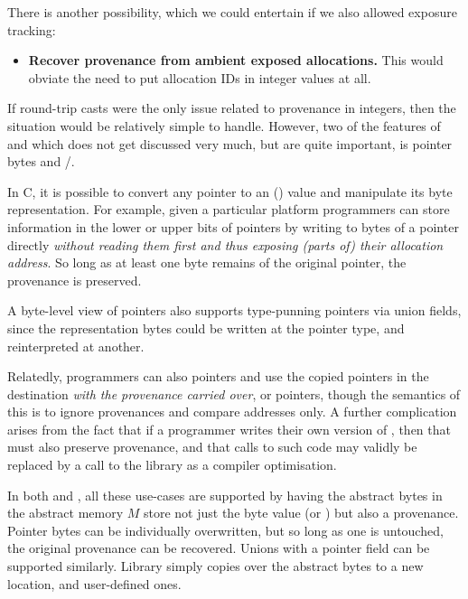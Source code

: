 There is another possibility, which we could entertain if we also allowed
exposure tracking:
\begin{itemize}
    \item \textbf{Recover provenance from ambient exposed allocations.} This
        would obviate the need to put allocation IDs in integer values at all.
\end{itemize}

If round-trip casts were the only issue related to provenance in integers, then
the situation would be relatively simple to handle. However, two of the
features of  and  which does not get discussed very
much, but are quite important, is pointer bytes and
/.

In C, it is possible to convert any pointer to an ()
 value and manipulate its byte representation. For example,
given a particular platform programmers can store information in the lower or upper bits of
pointers by writing to bytes of a pointer directly
\emph{without reading them first and thus exposing (parts of) their allocation
address}. So long as at least one byte remains of the original pointer, the
provenance is preserved.

A byte-level view of pointers also supports type-punning pointers via union
fields, since the representation bytes could be written at the pointer type,
and reinterpreted at another.

Relatedly, programmers can also  pointers and use the copied
pointers in the destination \emph{with the provenance carried over}, or
 pointers, though the semantics of this is to ignore
provenances and compare addresses only. A further complication arises from the
fact that if a programmer writes their own version of , then
that must also preserve provenance, and that calls to such code may validly be
replaced by a call to the library  as a compiler
optimisation.

In both  and , all these use-cases are supported by
having the abstract bytes in the abstract memory $M$ store not just the
byte value (or ) but also a provenance. Pointer bytes
can be individually overwritten, but so long as one is untouched, the original
provenance can be recovered. Unions with a pointer field can be supported
similarly. Library  simply copies over the abstract bytes to a
new location, and user-defined ones.

